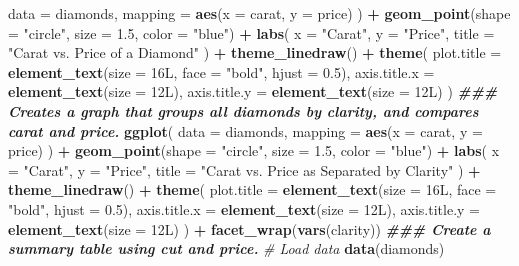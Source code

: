 \documentclass[
]{article}
\newenvironment{Shaded}{\begin{snugshade}}{\end{snugshade}}
\newcommand{\AttributeTok}[1]{\textcolor[rgb]{0.13,0.29,0.53}{#1}}
\newcommand{\CommentTok}[1]{\textcolor[rgb]{0.56,0.35,0.01}{\textit{#1}}}
\newcommand{\DocumentationTok}[1]{\textcolor[rgb]{0.56,0.35,0.01}{\textbf{\textit{#1}}}}
\newcommand{\FloatTok}[1]{\textcolor[rgb]{0.00,0.00,0.81}{#1}}
\newcommand{\FunctionTok}[1]{\textcolor[rgb]{0.13,0.29,0.53}{\textbf{#1}}}
\newcommand{\NormalTok}[1]{#1}
\newcommand{\SpecialCharTok}[1]{\textcolor[rgb]{0.81,0.36,0.00}{\textbf{#1}}}
\newcommand{\StringTok}[1]{\textcolor[rgb]{0.31,0.60,0.02}{#1}}
\begin{document}
\begin{Shaded}
\begin{Highlighting}[]
  \AttributeTok{data =}\NormalTok{ diamonds,}
  \AttributeTok{mapping =} \FunctionTok{aes}\NormalTok{(}\AttributeTok{x =}\NormalTok{ carat,}
                \AttributeTok{y =}\NormalTok{ price)}
\NormalTok{) }\SpecialCharTok{+}
  \FunctionTok{geom\_point}\NormalTok{(}\AttributeTok{shape =} \StringTok{"circle"}\NormalTok{,}
             \AttributeTok{size =} \FloatTok{1.5}\NormalTok{,}
             \AttributeTok{color =} \StringTok{"blue"}\NormalTok{) }\SpecialCharTok{+}
  \FunctionTok{labs}\NormalTok{(}
    \AttributeTok{x =} \StringTok{"Carat"}\NormalTok{,}
    \AttributeTok{y =} \StringTok{"Price"}\NormalTok{,}
    \AttributeTok{title =} \StringTok{"Carat vs. Price of a Diamond"}
\NormalTok{  ) }\SpecialCharTok{+}
  \FunctionTok{theme\_linedraw}\NormalTok{() }\SpecialCharTok{+}
  \FunctionTok{theme}\NormalTok{(}
    \AttributeTok{plot.title =} \FunctionTok{element\_text}\NormalTok{(}\AttributeTok{size =}\NormalTok{ 16L,}
                              \AttributeTok{face =} \StringTok{"bold"}\NormalTok{,}
                              \AttributeTok{hjust =} \FloatTok{0.5}\NormalTok{),}
    \AttributeTok{axis.title.x =} \FunctionTok{element\_text}\NormalTok{(}\AttributeTok{size =}\NormalTok{ 12L),}
    \AttributeTok{axis.title.y =} \FunctionTok{element\_text}\NormalTok{(}\AttributeTok{size =}\NormalTok{ 12L)}
\NormalTok{    )}
\DocumentationTok{\#\#\# Creates a graph that groups all diamonds by clarity, and compares carat and price.}
\FunctionTok{ggplot}\NormalTok{(}
  \AttributeTok{data =}\NormalTok{ diamonds,}
  \AttributeTok{mapping =} \FunctionTok{aes}\NormalTok{(}\AttributeTok{x =}\NormalTok{ carat,}
                \AttributeTok{y =}\NormalTok{ price)}
\NormalTok{) }\SpecialCharTok{+}
  \FunctionTok{geom\_point}\NormalTok{(}\AttributeTok{shape =} \StringTok{"circle"}\NormalTok{,}
             \AttributeTok{size =} \FloatTok{1.5}\NormalTok{,}
             \AttributeTok{color =} \StringTok{"blue"}\NormalTok{) }\SpecialCharTok{+}
  \FunctionTok{labs}\NormalTok{(}
    \AttributeTok{x =} \StringTok{"Carat"}\NormalTok{,}
    \AttributeTok{y =} \StringTok{"Price"}\NormalTok{,}
    \AttributeTok{title =} \StringTok{"Carat vs. Price as Separated by Clarity"}
\NormalTok{  ) }\SpecialCharTok{+}
  \FunctionTok{theme\_linedraw}\NormalTok{() }\SpecialCharTok{+}
  \FunctionTok{theme}\NormalTok{(}
    \AttributeTok{plot.title =} \FunctionTok{element\_text}\NormalTok{(}\AttributeTok{size =}\NormalTok{ 16L,}
                              \AttributeTok{face =} \StringTok{"bold"}\NormalTok{,}
                              \AttributeTok{hjust =} \FloatTok{0.5}\NormalTok{),}
    \AttributeTok{axis.title.x =} \FunctionTok{element\_text}\NormalTok{(}\AttributeTok{size =}\NormalTok{ 12L),}
    \AttributeTok{axis.title.y =} \FunctionTok{element\_text}\NormalTok{(}\AttributeTok{size =}\NormalTok{ 12L)}
\NormalTok{    ) }\SpecialCharTok{+}
  \FunctionTok{facet\_wrap}\NormalTok{(}\FunctionTok{vars}\NormalTok{(clarity))}
\DocumentationTok{\#\#\# Create a summary table using cut and price.}
\CommentTok{\# Load data}
\FunctionTok{data}\NormalTok{(diamonds)}


\end{Highlighting}
\end{Shaded}
\end{document}
